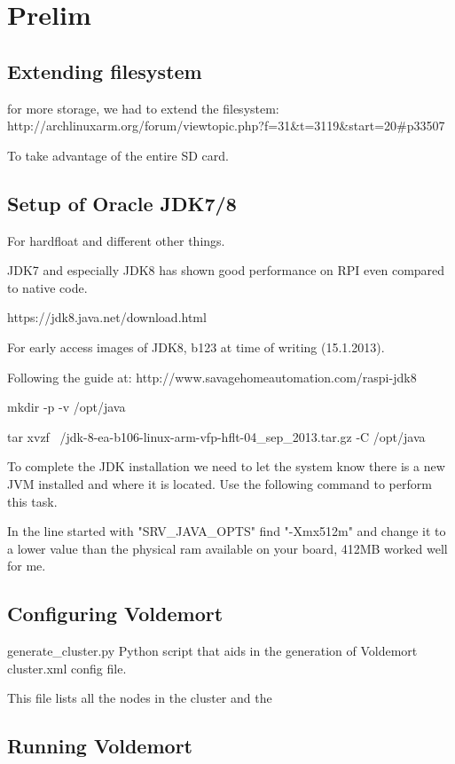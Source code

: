 \section{Prelim}

\subsection{Extending filesystem}
for more storage, we had to extend the filesystem:
http://archlinuxarm.org/forum/viewtopic.php?f=31&t=3119&start=20#p33507

To take advantage of the entire SD card.

\subsection{Setup of Oracle JDK7/8}
For hardfloat and different other things.

JDK7 and especially JDK8 has shown good performance on RPI even compared to native code.

https://jdk8.java.net/download.html

For early access images of JDK8, b123 at time of writing (15.1.2013).

Following the guide at: http://www.savagehomeautomation.com/raspi-jdk8

mkdir -p -v /opt/java

tar xvzf ~/jdk-8-ea-b106-linux-arm-vfp-hflt-04_sep_2013.tar.gz -C /opt/java

To complete the JDK installation we need to let the system know there is a new JVM installed and where it is located.  Use the following command to perform this task.


In the line started with "SRV_JAVA_OPTS" find "-Xmx512m" and change it to a lower value than the physical ram available on your board, 412MB worked well for me.


\subsection{Configuring Voldemort}

generate\_cluster.py
Python script that aids in the generation of Voldemort cluster.xml config file.

This file lists all the nodes in the cluster and the
\subsection{Running Voldemort}

